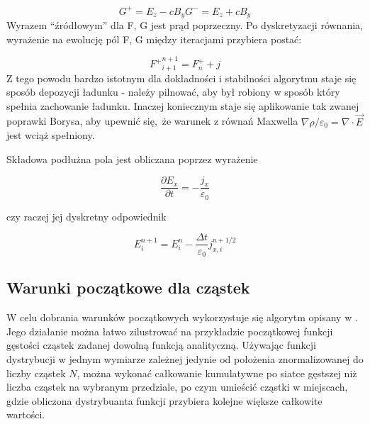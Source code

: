 {    
    \begin{equation}
        G^{+} = E_z - c B_y
        G^{-} = E_z + c B_y
        \label{eqn:Birdsall-electromagnetic-quantities-alternate-axes}
    \end{equation}
    Wyrazem ``źródłowym'' dla F, G jest prąd poprzeczny. Po dyskretyzacji równania, wyrażenie na ewolucję pól F, G między
    iteracjami przybiera postać:

    \begin{equation}
        {F^{+}}^{n+1}_{i+1} = F^{+}_{n} + j
    \end{equation}
    Z tego powodu bardzo istotnym dla dokładności i stabilności algorytmu staje się sposób depozycji ładunku - należy pilnować,
    aby był robiony w sposób który spełnia zachowanie ładunku. Inaczej koniecznym staje się aplikowanie tak zwanej
    poprawki Borysa, 
    aby upewnić się, że warunek z równań Maxwella $\nabla \rho / \varepsilon_0 = \nabla \cdot \vec{E}$ jest
    wciąż spełniony.

    Składowa podłużna pola jest obliczana poprzez wyrażenie

    \begin{equation}
    \frac{\partial E_x}{\partial t} = - \frac{j_x}{\varepsilon_0}
    \label{longitudinal-field-differential}
    \end{equation}

    czy raczej jej dyskretny odpowiednik

    \begin{equation}
        E_i^{n+1} = E_i^n - \frac{\Delta t}{\varepsilon_0} j_{x,i}^{n+1/2}
    \label{longitudinal-field-finite-differential}
    \end{equation}


    \subsection{Warunki początkowe dla cząstek}

    W celu dobrania warunków początkowych wykorzystuje się algorytm opisany w .
    Jego działanie można łatwo zilustrować na przykładzie początkowej funkcji gęstości cząstek zadanej
    dowolną funkcją analityczną. 
    Używając funkcji dystrybucji w jednym wymiarze zależnej jedynie od położenia znormalizowanej do
    liczby cząstek $N$, można wykonać całkowanie kumulatywne po siatce gęstszej niż liczba cząstek
    na wybranym przedziale, po czym umieścić cząstki w miejscach, gdzie obliczona dystrybuanta funkcji
    przybiera kolejne większe całkowite wartości.

}
